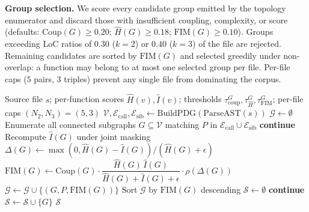 \textbf{Group selection.}
We score every candidate group emitted by the topology enumerator and
discard those with insufficient coupling, complexity, or score
(defaults: $\mathrm{Coup}(G) \ge 0.20$; $\hat{H}(G) \ge 0.18$;
$\mathrm{FIM}(G) \ge 0.10$). Groups exceeding LoC ratios of $0.30$
($k=2$) or $0.40$ ($k=3$) of the file are rejected. Remaining
candidates are sorted by $\mathrm{FIM}(G)$ and selected greedily under
non-overlap: a function may belong to at most one selected group per
file. Per-file caps ($5$ pairs, $3$ triples) prevent any single file
from dominating the corpus.

\begin{algorithm}[h]
\caption{Multi-function group FIM target selection for one file.}
\label{alg:selection_multi}
\begin{algorithmic}[1]
  \Require Source file $s$; per-function scores $\hat{H}(v),\hat{I}(v)$;
           thresholds $\tau^G_{\mathrm{coup}}, \tau^G_{\hat H}, \tau^G_{\mathrm{FIM}}$;
           per-file caps $(N_2, N_3)=(5, 3)$
  \State $\mathcal{V}, \mathcal{E}_{\mathrm{call}}, \mathcal{E}_{\mathrm{sib}} \gets \mathrm{BuildPDG}(\mathrm{ParseAST}(s))$
  \State $\mathcal{G} \gets \emptyset$
    \State Enumerate all connected subgraphs $G \subseteq \mathcal{V}$ matching $P$
           in $\mathcal{E}_{\mathrm{call}}\cup\mathcal{E}_{\mathrm{sib}}$
        \State \textbf{continue}
      \EndIf
      \State Recompute $\hat{I}(G)$ under joint masking
      \State $\Delta(G) \gets \max(0, \hat{H}(G)-\hat{I}(G))/(\hat{H}(G)+\epsilon)$
      \State $\mathrm{FIM}(G) \gets \mathrm{Coup}(G)\cdot
              \dfrac{\hat{H}(G)\,\hat{I}(G)}{\hat{H}(G)+\hat{I}(G)+\epsilon}\cdot \rho(\Delta(G))$
        \State $\mathcal{G} \gets \mathcal{G} \cup \{(G,P,\mathrm{FIM}(G))\}$
      \EndIf
    \EndFor
  \EndFor
  \State Sort $\mathcal{G}$ by $\mathrm{FIM}(G)$ descending
  \State $\mathcal{S} \gets \emptyset$
      \State \textbf{continue}
    \EndIf
    \State $\mathcal{S} \gets \mathcal{S} \cup \{G\}$
  \EndFor
  \State \Return $\mathcal{S}$
\end{algorithmic}
\end{algorithm}

